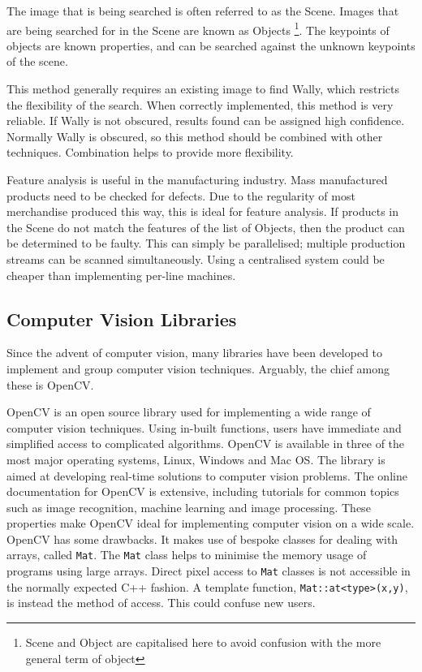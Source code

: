 \documentclass[../main.tex]{subfiles}
\begin{document}
      The image that is being searched is often referred to as the Scene.
      Images that are being searched for in the Scene are known as Objects
      \footnote{Scene and Object are capitalised here to avoid confusion with the more general term of object}.
      The keypoints of objects are known properties, and can be searched against the unknown keypoints of the scene.

      This method generally requires an existing image to find Wally, which restricts the flexibility of the search.
      When correctly implemented, this method is very reliable.
      If Wally is not obscured, results found can be assigned high confidence.
      Normally Wally is obscured, so this method should be combined with other techniques.
      Combination helps to provide more flexibility.

      Feature analysis is useful in the manufacturing industry.
      Mass manufactured products need to be checked for defects.
      Due to the regularity of most merchandise produced this way, this is ideal for feature analysis.
      If products in the Scene do not match the features of the list of Objects, then the product can be determined to be faulty.
      This can simply be parallelised; multiple production streams can be scanned simultaneously.
      Using a centralised system could be cheaper than implementing per-line machines.
  \subsection{Computer Vision Libraries}
    Since the advent of computer vision, many libraries have been developed to implement and group computer vision techniques.
    Arguably, the chief among these is OpenCV.

    OpenCV\cite{opencv} is an open source library used for implementing a wide range of computer vision techniques. 
    Using in-built functions, users have immediate and simplified access to complicated algorithms.
    OpenCV is available in three of the most major operating systems, Linux, Windows and Mac OS.
    The library is aimed at developing real-time solutions to computer vision problems\cite{learningopencv}.
    The online documentation for OpenCV is extensive, including tutorials for common topics such as image recognition, machine learning and image processing.
    These properties make OpenCV ideal for implementing computer vision on a wide scale.
    OpenCV has some drawbacks. 
    It makes use of bespoke classes for dealing with arrays, called \texttt{Mat}.
    The \texttt{Mat} class helps to minimise the memory usage of programs using large arrays.
    Direct pixel access to \texttt{Mat} classes is not accessible in the normally expected C++ fashion.
    A template function, \texttt{Mat::at<type>(x,y)}, is instead the method of access.
    This could confuse new users.
    
\end{document}
